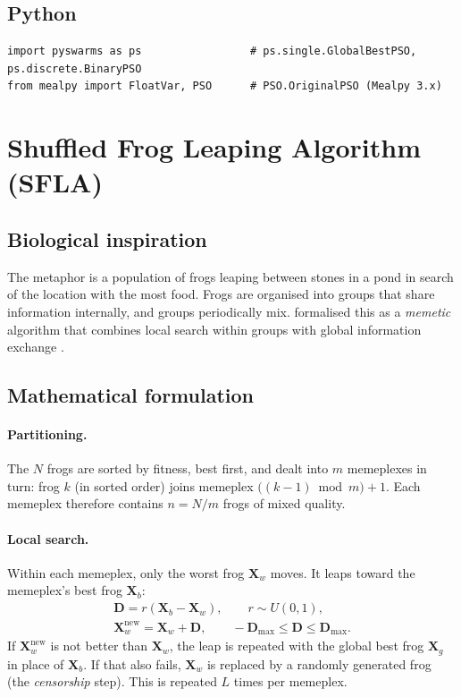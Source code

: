 \documentclass[11pt,a4paper]{article}
\newcommand{\vect}[1]{\mathbf{#1}}
\begin{document}
\subsection{Python}

\begin{lstlisting}
import pyswarms as ps                 # ps.single.GlobalBestPSO, ps.discrete.BinaryPSO
from mealpy import FloatVar, PSO      # PSO.OriginalPSO (Mealpy 3.x)
\end{lstlisting}

\section{Shuffled Frog Leaping Algorithm (SFLA)}
\label{sec:sfla}

\subsection{Biological inspiration}

The metaphor is a population of frogs leaping between stones in a pond in search of the location with the most food. Frogs are organised into groups that share information internally, and groups periodically mix. \citet{eusuff2003} formalised this as a \emph{memetic} algorithm that combines local search within groups with global information exchange \citep[see also][]{eusuff2006}.

\subsection{Mathematical formulation}

\paragraph{Partitioning.} The $N$ frogs are sorted by fitness, best first, and dealt into $m$ memeplexes in turn: frog $k$ (in sorted order) joins memeplex $\big((k-1) \bmod m\big) + 1$. Each memeplex therefore contains $n = N/m$ frogs of mixed quality.

\paragraph{Local search.} Within each memeplex, only the worst frog $\vect{X}_w$ moves. It leaps toward the memeplex's best frog $\vect{X}_b$:
\begin{gather}
  \vect{D} = r \left( \vect{X}_b - \vect{X}_w \right), \qquad r \sim U(0,1), \\
  \vect{X}_w^{\text{new}} = \vect{X}_w + \vect{D}, \qquad -\vect{D}_{\max} \le \vect{D} \le \vect{D}_{\max}.
\end{gather}
If $\vect{X}_w^{\text{new}}$ is not better than $\vect{X}_w$, the leap is repeated with the global best frog $\vect{X}_g$ in place of $\vect{X}_b$. If that also fails, $\vect{X}_w$ is replaced by a randomly generated frog (the \emph{censorship} step). This is repeated $L$ times per memeplex.
\end{document}
